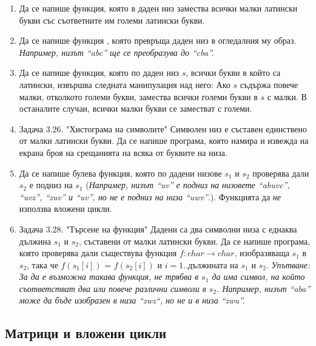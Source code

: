 {\begin{enumerate}[resume]
  \item Да се напише функция, която в даден низ замества всички малки латински букви със съответните им големи латински букви.

  \item Да се напише функция , която превръща даден низ в огледалния му образ. \textit{Например, низът ``abc'' ще се преобразува до ``cba''.}

  \item Да се напише функция, която по даден низ $s$, всички букви в който са латински, извършва следната манипулация над него: Ако $s$ съдържа повече малки, отколкото големи букви, замества всички големи букви в $s$ с малки. В останалите случаи, всички малки букви се заместват с големи.

	\item Задача 3.26. "Хистограма на символите" \cite{sbornik} Символен низ е съставен единствено от малки латински букви. Да се напише програма, която намира и извежда на екрана броя на срещанията на всяка от буквите на низа.

  \item Да се напише булева функция, която по дадени низове $s_1$ и $s_2$ проверява дали $s_2$ е подниз на $s_1$ (\textit{Например, низът ``uv'' е подниз на низовете ``abuvc'', ``uvz'', ``zuv'' и ``uv'', но не е подниз на низа ``uwv''}.). Функцията да \emph{не} използва вложени цикли.

  \item Задача 3.28. "Търсене на функция" \cite{sbornik} Дадени са два символни низа с еднаква дължина $s_1$ и $s_2$, съставени от малки латински букви. Да се напише програма, която проверява дали съществува функция $f:char \rightarrow char$, изобразяваща $s_1$ в $s_2$, така че $f(s_1[i])$ = $f(s_2[i])$ и $i=1..$дължината на $s_1$ и $s_2$. \textit{Упътване: За да е възможна такава функция, не трябва в $s_1$ да има символ, на който съответстват два или повече различни символи в $s_2$. Например, низът ``aba'' може да бъде изобразен в низа ``zwz``, но не и в низа ``zwu''.}

\end{enumerate}


\pagebreak

\subsection {Матрици и вложени цикли}

\begin{enumerate}[resume]


\end{enumerate}}
